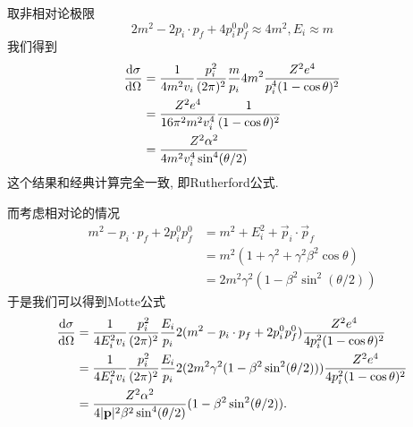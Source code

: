 \begin{example}
    取非相对论极限
    \begin{equation}
    2m^2-2p_i\cdot p_f+4p_i^0p_f^0\approx 4m^2, E_i\approx m
    \end{equation}
    我们得到
    \begin{align}
        \frac{\mathrm d\sigma}{\mathrm d\Omega}&=\frac{1}{4m^2v_i}\frac{p_i^2}{(2\pi)^{2}}\frac{m}{p_i}4m^2\frac{Z^2e^4}{p_i^4(1-\cos\theta)^2}\\
        &=\frac{Z^2e^4}{16\pi^2m^2v_i^4}\frac1{(1-\cos\theta)^2}\\
        &=\frac{Z^2\alpha^2}{4m^2v_i^4\sin^4(\theta/2)}
    \end{align}
    这个结果和经典计算完全一致, 即Rutherford公式.

    而考虑相对论的情况
    \begin{align}
        m^2-p_i\cdot p_f+2p_i^0p_f^0&=m^2+E_i^2+\vec p_i\cdot\vec p_f\\
        &=m^2(1+\gamma^2+\gamma^2\beta^2\cos\theta)\\
        &=2m^2\gamma^2(1-\beta^2\sin^2(\theta/2))
    \end{align}
    于是我们可以得到Motte公式
    \begin{align}
        \frac{\mathrm d\sigma}{\mathrm d\Omega}&=\frac1{4E_i^2v_i}\frac{p_i^2}{(2\pi)^{2}}\frac{E_i}{p_i}2(m^2-p_i\cdot p_f+2p_i^0p_f^0)\frac{Z^2e^4}{4p_i^2(1-\cos\theta)^2}\\
        &=\frac1{4E_i^2v_i}\frac{p_i^2}{(2\pi)^{2}}\frac{E_i}{p_i}2(2m^2\gamma^2(1-\beta^2\sin^2(\theta/2)))\frac{Z^2e^4}{4p_i^2(1-\cos\theta)^2}\\
        &=\frac{Z^2\alpha^2}{4|\mathbf{p}|^2\beta^2\sin^4(\theta/2)}(1-\beta^2\sin^2(\theta/2)).
    \end{align}
\end{example}
